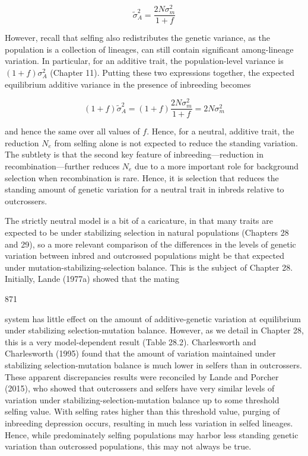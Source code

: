 \documentclass{article}
\begin{document}
\begin{equation}
\widetilde{\sigma}_{A}^{2}=\frac{2N\sigma_{m}^{2}}{1+f}
\tag{23.70a}
\label{eq:23_70a}
\end{equation}

However, recall that selfing also redistributes the genetic variance, as the population is a collection of lineages, can still contain significant among-lineage variation. In particular, for an additive trait, the population-level variance is  $ (1 + f)\sigma_A^2 $ (Chapter 11). Putting these two expressions together, the expected equilibrium additive variance in the presence of inbreeding becomes

\begin{equation}
(1+f)\widetilde{\sigma}_{A}^{2}=(1+f)\frac{2N\sigma_{m}^{2}}{1+f}=2N\sigma_{m}^{2}
\tag{23.70b}
\label{eq:23_70b}
\end{equation}

and hence the same over all values of  $ f $. Hence, for a neutral, additive trait, the reduction  $ N_e $ from selfing alone is not expected to reduce the standing variation. The subtlety is that the second key feature of inbreeding—reduction in recombination—further reduces  $ N_e $ due to a more important role for background selection when recombination is rare. Hence, it is selection that reduces the standing amount of genetic variation for a neutral trait in inbreds relative to outcrossers.

The strictly neutral model is a bit of a caricature, in that many traits are expected to be under stabilizing selection in natural populations (Chapters 28 and 29), so a more relevant comparison of the differences in the levels of genetic variation between inbred and outcrossed populations might be that expected under mutation-stabilizing-selection balance. This is the subject of Chapter 28. Initially, Lande (1977a) showed that the mating

871

system has little effect on the amount of additive-genetic variation at equilibrium under stabilizing selection-mutation balance. However, as we detail in Chapter 28, this is a very model-dependent result (Table 28.2). Charlesworth and Charlesworth (1995) found that the amount of variation maintained under stabilizing selection-mutation balance is much lower in selfers than in outcrossers. These apparent discrepancies results were reconciled by Lande and Porcher (2015), who showed that outcrossers and selfers have very similar levels of variation under stabilizing-selection-mutation balance up to some threshold selfing value. With selfing rates higher than this threshold value, purging of inbreeding depression occurs, resulting in much less variation in selfed lineages. Hence, while predominately selfing populations may harbor less standing genetic variation than outcrossed populations, this may not always be true.
\end{document}

